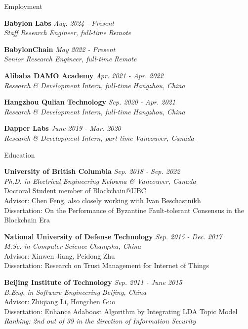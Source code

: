 \documentclass{resume} %
\begin{document}

\begin{rSection}{Employment}

{\bf Babylon Labs} \hfill {\em Aug. 2024 - Present} \\ 
{\em Staff Research Engineer, full-time} \hfill {\em Remote}

{\bf BabylonChain} \hfill {\em May 2022 - Present} \\ 
{\em Senior Research Engineer, full-time} \hfill {\em Remote}

{\bf Alibaba DAMO Academy} \hfill {\em Apr. 2021 - Apr. 2022} \\ 
{\em Research \& Development Intern, full-time} \hfill {\em Hangzhou, China}

{\bf Hangzhou Qulian Technology} \hfill {\em Sep. 2020 - Apr. 2021} \\ 
{\em Research \& Development Intern, full-time} \hfill {\em Hangzhou, China}

{\bf Dapper Labs} \hfill {\em June 2019 - Mar. 2020} \\ 
{\em Research \& Development Intern, part-time} \hfill {\em Vancouver, Canada}

\end{rSection}

\begin{rSection}{Education}

{\bf University of British Columbia} \hfill {\em Sep. 2018 - Sep. 2022} \\ 
{\em Ph.D. in Electrical Engineering} \hfill {\em Kelowna \& Vancouver, Canada}\\
Doctoral Student member of Blockchain@UBC \\
Advisor: Chen Feng, also closely working with Ivan Beschastnikh\\
Dissertation: On the Performance of Byzantine Fault-tolerant Consensus in the Blockchain Era \smallskip

{\bf National University of Defense Technology} \hfill {\em Sep. 2015 - Dec. 2017} \\ 
{\em M.Sc. in Computer Science} \hfill {\em Changsha, China}\\
Advisor: Xinwen Jiang, Peidong Zhu\\
Dissertation: Research on Trust Management for Internet of Things \smallskip

{\bf Beijing Institute of Technology} \hfill {\em Sep. 2011 - June 2015} \\ 
{\em B.Eng. in Software Engineering} \hfill {\em Beijing, China}\\
Advisor: Zhiqiang Li, Hongchen Guo\\
Dissertation: Enhance Adaboost Algorithm by Integrating LDA Topic Model\\
\em Ranking: 2nd out of 39 in the direction of Information Security

\end{rSection}
\end{document}
